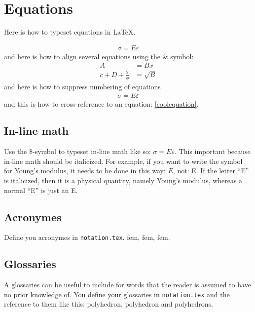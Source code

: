\section{Equations}
Here is how to typeset equations in \LaTeX{}.

\begin{align}
\sigma = E\varepsilon \label{coolequation}
\end{align}
and here is how to align several equations using the \& symbol:
\begin{align}
A &= Bx \\ %
c + D +\frac{2}{\phi} &= \sqrt{B}
\end{align}
and here is how to suppress numbering of equations
\begin{align*}
\sigma = E\varepsilon
\end{align*}
and this is how to cross-reference to an equation: \cref{coolequation}.

\subsection{In-line math}
Use the \$-symbol to typeset in-line math like so: $\sigma = E\varepsilon$. This important because in-line math should be italicized. For example, if you want to write the symbol for Young's modulus, it needs to be done in this way: $E$, not: E. If the letter ``E'' is italicized, then it is a physical quantity, namely Young's modulus, whereas a normal ``E'' is just an E.

\subsection{Acronymes}
Define you acronymes in \texttt{notation.tex}. \acrlong{fem}, \acrshort{fem}, \acrfull{fem}.

\subsection{Glossaries}
A glossaries can be useful to include for words that the reader is assumed to have no prior knowledge of. You define your glossaries in \texttt{notation.tex} and the reference to them like this: \Gls{polyhedron}, \gls{polyhedron} and \glspl{polyhedron}.